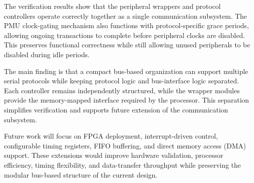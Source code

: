 \documentclass[runningheads]{llncs}
\begin{document}
The verification results show that the peripheral wrappers and protocol controllers operate correctly together as a single communication subsystem. The PMU clock-gating mechanism also functions with protocol-specific grace periods, allowing ongoing transactions to complete before peripheral clocks are disabled. This preserves functional correctness while still allowing unused peripherals to be disabled during idle periods.

The main finding is that a compact bus-based organization can support multiple serial protocols while keeping protocol logic and bus-interface logic separated. Each controller remains independently structured, while the wrapper modules provide the memory-mapped interface required by the processor. This separation simplifies verification and supports future extension of the communication subsystem.

Future work will focus on FPGA deployment, interrupt-driven control, configurable timing registers, FIFO buffering, and direct memory access (DMA) support. These extensions would improve hardware validation, processor efficiency, timing flexibility, and data-transfer throughput while preserving the modular bus-based structure of the current design.
\end{document}

